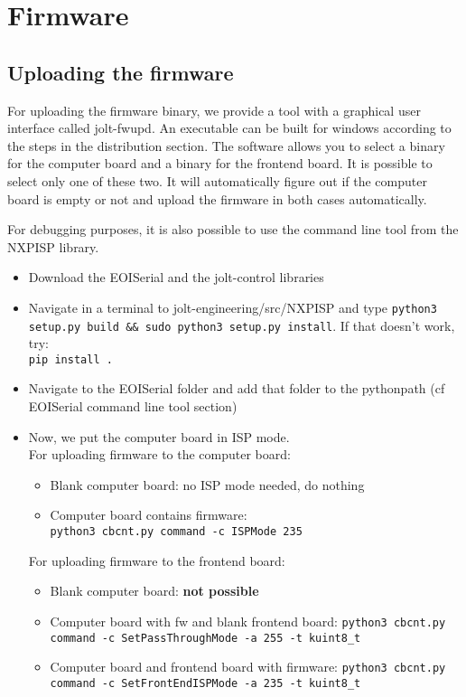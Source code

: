 \documentclass[]{article}
\begin{document}
\section{Firmware}

\subsection{Uploading the firmware}
For uploading the firmware binary, we provide a tool with a graphical user interface called jolt-fwupd. An executable can be built for windows according to the steps in the distribution section. The software allows you to select a binary for the computer board and a binary for the frontend board. It is possible to select only one of these two. It will automatically figure out if the computer board is empty or not and upload the firmware in both cases automatically.

For debugging purposes, it is also possible to use the command line tool from the NXPISP library.
\begin{itemize}
	\item Download the EOISerial and the jolt-control libraries
	\item Navigate in a terminal to jolt-engineering/src/NXPISP and type \texttt{python3 setup.py build \&\& sudo python3 setup.py install}. If that doesn't work, try:\\ \texttt{pip install .}
	\item Navigate to the EOISerial folder and add that folder to the pythonpath (cf EOISerial command line tool section)
	\item Now, we put the computer board in ISP mode. \\
	For uploading firmware to the computer board:
	\begin{itemize}
		\item Blank computer board: no ISP mode needed, do nothing
		\item Computer board contains firmware: \\
		\texttt{python3 cbcnt.py command -c ISPMode 235}
	\end{itemize}
	For uploading firmware to the frontend board:
\begin{itemize}
	\item Blank computer board: \textbf{not possible}
	\item Computer board with fw and blank frontend board: \texttt{python3 cbcnt.py command -c SetPassThroughMode -a 255 -t kuint8\_t}
	\item Computer board and frontend board with firmware: \texttt{python3 cbcnt.py command -c SetFrontEndISPMode -a 235 -t kuint8\_t}
\end{itemize}

\end{itemize}
\end{document}
